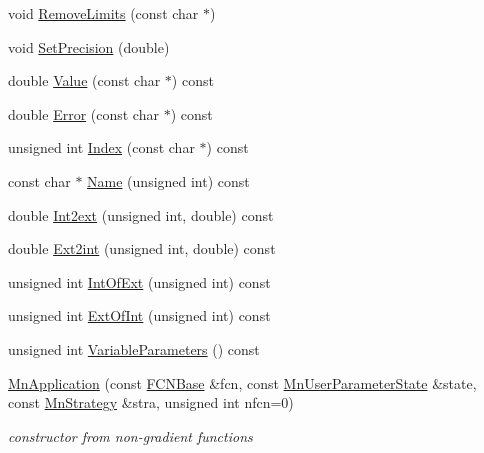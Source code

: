 \begin{DoxyCompactItemize}
\item 
void \mbox{\hyperlink{classROOT_1_1Minuit2_1_1MnApplication_ae33804b5db979701f0f86b88b4124dd0}{Remove\+Limits}} (const char $\ast$)
\item 
void \mbox{\hyperlink{classROOT_1_1Minuit2_1_1MnApplication_a054caa9f6e7b2617c182b6b43b97c900}{Set\+Precision}} (double)
\item 
double \mbox{\hyperlink{classROOT_1_1Minuit2_1_1MnApplication_a0848e9b8eb22d5b23b6ba01ddcf8c135}{Value}} (const char $\ast$) const
\item 
double \mbox{\hyperlink{classROOT_1_1Minuit2_1_1MnApplication_a6997e4fd745e4048609c697f74c92eb8}{Error}} (const char $\ast$) const
\item 
unsigned int \mbox{\hyperlink{classROOT_1_1Minuit2_1_1MnApplication_a6b6e2bc386692b9e3cd8a9ad01fc175e}{Index}} (const char $\ast$) const
\item 
const char $\ast$ \mbox{\hyperlink{classROOT_1_1Minuit2_1_1MnApplication_ad333315ce51772fef3094491b37f309d}{Name}} (unsigned int) const
\item 
double \mbox{\hyperlink{classROOT_1_1Minuit2_1_1MnApplication_a1ca8337823e271c40f05f6da6ea8e231}{Int2ext}} (unsigned int, double) const
\item 
double \mbox{\hyperlink{classROOT_1_1Minuit2_1_1MnApplication_a8c9379939f201ea95f32a2f1de575fca}{Ext2int}} (unsigned int, double) const
\item 
unsigned int \mbox{\hyperlink{classROOT_1_1Minuit2_1_1MnApplication_a7911389abce948da10dd82a8a172afd5}{Int\+Of\+Ext}} (unsigned int) const
\item 
unsigned int \mbox{\hyperlink{classROOT_1_1Minuit2_1_1MnApplication_a61dc63d2a6320aae96867ad57918c496}{Ext\+Of\+Int}} (unsigned int) const
\item 
unsigned int \mbox{\hyperlink{classROOT_1_1Minuit2_1_1MnApplication_afc0ad887758b1609cbcae1c8b6a5a467}{Variable\+Parameters}} () const
\item 
\mbox{\hyperlink{classROOT_1_1Minuit2_1_1MnApplication_ac3bea3d025068f8bc7d8a6701f23aa81}{Mn\+Application}} (const \mbox{\hyperlink{classROOT_1_1Minuit2_1_1FCNBase}{F\+C\+N\+Base}} \&fcn, const \mbox{\hyperlink{classROOT_1_1Minuit2_1_1MnUserParameterState}{Mn\+User\+Parameter\+State}} \&state, const \mbox{\hyperlink{classROOT_1_1Minuit2_1_1MnStrategy}{Mn\+Strategy}} \&stra, unsigned int nfcn=0)
\begin{DoxyCompactList}\small\item\em constructor from non-\/gradient functions \end{DoxyCompactList}\item 

\end{DoxyCompactItemize}
